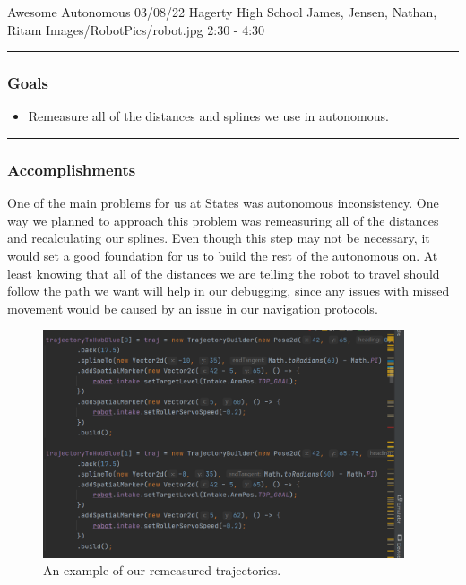 \insertmeeting 
	{Awesome Autonomous} 
	{03/08/22} 
	{Hagerty High School}
	{James, Jensen, Nathan, Ritam}
	{Images/RobotPics/robot.jpg}
	{2:30 - 4:30}
	
\noindent\hfil\rule{\textwidth}{.4pt}\hfil
\subsubsection*{Goals}
\begin{itemize}
    \item Remeasure all of the distances and splines we use in autonomous.

\end{itemize} 

\noindent\hfil\rule{\textwidth}{.4pt}\hfil

\subsubsection*{Accomplishments}
One of the main problems for us at States was autonomous inconsistency. One way we planned to approach this problem was remeasuring all of the distances and recalculating our splines. Even though this step may not be necessary, it would set a good foundation for us to build the rest of the autonomous on. At least knowing that all of the distances we are telling the robot to travel should follow the path we want will help in our debugging, since any issues with missed movement would be caused by an issue in our navigation protocols. 


\begin{figure}[htp]
\centering
\includegraphics[width=0.95\textwidth, angle=0]{Meetings/March/03-08-22/03-08-22 1.png}
\caption{An example of our remeasured trajectories.}
\label{fig:030822_1}
\end{figure}





